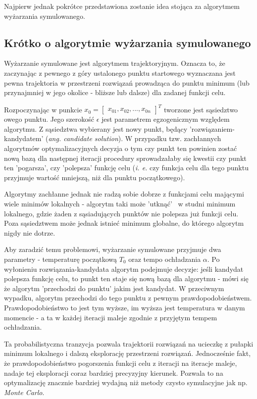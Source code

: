 \documentclass[12pt,a4paper,twoside,openany]{book}
\begin{document}
Najpierw jednak pokrótce przedstawiona zostanie idea stojąca za algorytmem wyżarzania symulowanego.

\subsection{Krótko o algorytmie wyżarzania symulowanego}
\label{subsection:simulated-annealing-desc}

Wyżarzanie symulowane jest algorytmem trajektoryjnym.
Oznacza to, że zaczynając z pewnego z góry ustalonego punktu startowego wyznaczana jest pewna trajektoria w przestrzeni rozwiązań prowadząca do punktu minimum (lub przynajmniej w jego okolice - bliższe lub dalsze) dla zadanej funkcji celu.

Rozpoczynając w punkcie $x_0 = \begin{bmatrix}x_{01}, x_{02}, ..., x_{0n} \end{bmatrix}^T$ tworzone jest sąsiedztwo owego punktu.
Jego szerokość $\epsilon$ jest parametrem egzogenicznym względem algorytmu.
Z sąsiedztwa wybierany jest nowy punkt, będący 'rozwiązaniem-kandydatem' (\textit{ang. candidate solution}).
W przypadku tzw. zachłannych algorytmów optymalizacyjnych decyzja o tym czy punkt ten powinien zostać nową bazą dla następnej iteracji procedury sprowadzałaby się kwestii czy punkt ten 'pogarsza', czy 'polepsza' funkcję celu (\textit{i. e.} czy funkcja celu dla tego punktu przyjmuje wartość mniejszą, niż dla punktu początkowego). 

Algorytmy zachłanne jednak nie radzą sobie dobrze z funkcjami celu mającymi wiele minimów lokalnych - algorytm taki może 'utknąć' ~w studni minimum lokalnego, gdzie żaden z sąsiadujących punktów nie polepsza już funkcji celu.
Poza sąsiedztwem może jednak istnieć minimum globalne, do którego algorytm nigdy nie dotrze.

Aby zaradzić temu problemowi, wyżarzanie symulowane przyjmuje dwa parametry - temperaturę początkową \textit{$T_{0}$} oraz tempo ochładzania $\alpha$.
Po wyłonieniu rozwiązania-kandydata algorytm podejmuje decyzje: jeśli kandydat polepsza funkcję celu, to punkt ten staje się nową bazą dla algorytmu - mówi się że algorytm 'przechodzi do punktu' jakim jest kandydat.
W przeciwnym wypadku, algorytm przechodzi do tego punktu z pewnym prawdopodobieństwem.
Prawdopodobieństwo to jest tym wyższe, im wyższa jest temperatura w danym momencie - a ta w każdej iteracji maleje zgodnie z przyjętym tempem ochładzania.

Ta probabilistyczna tranzycja pozwala trajektorii rozwiązań na ucieczkę z pułapki minimum lokalnego i dalszą eksplorację przestrzeni rozwiązań.
Jednocześnie fakt, że prawdopodobieństwo pogorszenia funkcji celu z iteracji na iteracje maleje, nadaje tej eksploracji coraz bardziej precyzyjny kierunek.
Pozwala to na optymalizację znacznie bardziej wydajną niż metody czysto symulacyjne jak np. \textit{Monte Carlo}.
\end{document}
